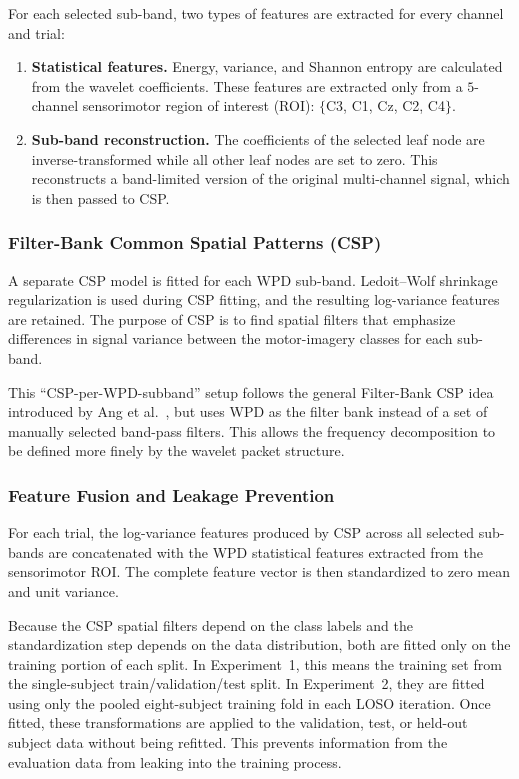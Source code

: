 \documentclass[11pt,a4paper]{article}
\begin{document}
	For each selected sub-band, two types of features are extracted for every channel and trial:
	
	\begin{enumerate}[leftmargin=1.2cm]
		\item \textbf{Statistical features.}
		Energy, variance, and Shannon entropy are calculated from the wavelet coefficients.
		These features are extracted only from a $5$-channel sensorimotor region of interest (ROI):
		$\{$C3, C1, Cz, C2, C4$\}$.
		
		\item \textbf{Sub-band reconstruction.}
		The coefficients of the selected leaf node are inverse-transformed while all other leaf
		nodes are set to zero. This reconstructs a band-limited version of the original
		multi-channel signal, which is then passed to CSP.
	\end{enumerate}
	
	\subsubsection{Filter-Bank Common Spatial Patterns (CSP)}
	
	A separate CSP model \cite{ramoser2000csp} is fitted for each WPD sub-band. Ledoit--Wolf
	shrinkage regularization is used during CSP fitting, and the resulting log-variance features
	are retained. The purpose of CSP is to find spatial filters that emphasize differences in
	signal variance between the motor-imagery classes for each sub-band.
	
	This ``CSP-per-WPD-subband'' setup follows the general Filter-Bank CSP idea introduced by
	Ang et al.\ \cite{ang2008fbcsp}, but uses WPD as the filter bank instead of a set of manually
	selected band-pass filters. This allows the frequency decomposition to be defined more finely
	by the wavelet packet structure.
	
	\subsubsection{Feature Fusion and Leakage Prevention}
	
	For each trial, the log-variance features produced by CSP across all selected sub-bands are
	concatenated with the WPD statistical features extracted from the sensorimotor ROI. The complete
	feature vector is then standardized to zero mean and unit variance.
	
	Because the CSP spatial filters depend on the class labels and the standardization step depends
	on the data distribution, both are fitted only on the training portion of each split. In
	Experiment~1, this means the training set from the single-subject train/validation/test split.
	In Experiment~2, they are fitted using only the pooled eight-subject training fold in each LOSO
	iteration. Once fitted, these transformations are applied to the validation, test, or held-out
	subject data without being refitted. This prevents information from the evaluation data from
	leaking into the training process.
	
\end{document}

